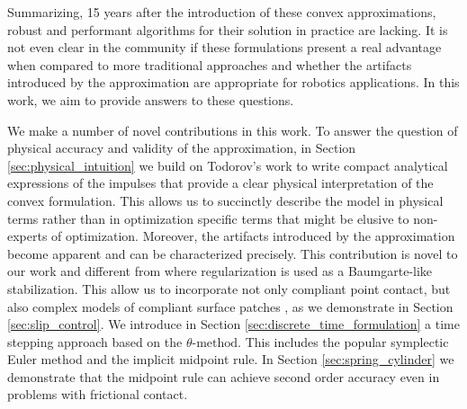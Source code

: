Summarizing, 15 years after the introduction of these convex
approximations, robust and performant algorithms for their solution in practice
are lacking. It is not even clear in the community if these formulations present
a real advantage when compared to more traditional approaches and whether the
artifacts introduced by the approximation are appropriate for robotics
applications. In this work, we aim to provide answers to these questions. 

We make a number of novel contributions in this work. To answer the question of
physical accuracy and validity of the approximation, in Section
\ref{sec:physical_intuition} we build on Todorov's work \cite{bib:todorov2014}
to write compact analytical expressions of the impulses that provide a clear
physical interpretation of the convex formulation. This allows us to succinctly
describe the model in physical terms rather than in optimization specific terms
that might be elusive to non-experts of optimization. Moreover, the artifacts
introduced by the approximation become apparent and can be characterized
precisely. This contribution is novel to our work and different from
\cite{bib:todorov2014} where regularization is used as a Baumgarte-like
stabilization. This allow us to incorporate not only compliant point contact,
but also complex models of compliant surface patches
\cite{bib:elandt2019pressure}, as we demonstrate in Section
\ref{sec:slip_control}. We introduce in Section
\ref{sec:discrete_time_formulation} a time stepping approach based on the
$\theta\text{-method}$. This includes the popular symplectic Euler method and
the implicit midpoint rule. In Section \ref{sec:spring_cylinder} we demonstrate
that the midpoint rule can achieve second order accuracy even in problems with
frictional contact.

